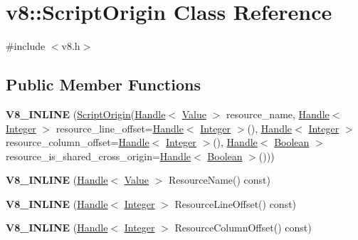 \hypertarget{classv8_1_1_script_origin}{}\section{v8\+:\+:Script\+Origin Class Reference}
\label{classv8_1_1_script_origin}


{\ttfamily \#include $<$v8.\+h$>$}

\subsection*{Public Member Functions}
\begin{DoxyCompactItemize}
\item 
\hypertarget{classv8_1_1_script_origin_a83d29998808aba54a562cdba15520d62}{}{\bfseries V8\+\_\+\+I\+N\+L\+I\+N\+E} (\hyperlink{classv8_1_1_script_origin}{Script\+Origin}(\hyperlink{classv8_1_1_handle}{Handle}$<$ \hyperlink{classv8_1_1_value}{Value} $>$ resource\+\_\+name, \hyperlink{classv8_1_1_handle}{Handle}$<$ \hyperlink{classv8_1_1_integer}{Integer} $>$ resource\+\_\+line\+\_\+offset=\hyperlink{classv8_1_1_handle}{Handle}$<$ \hyperlink{classv8_1_1_integer}{Integer} $>$(), \hyperlink{classv8_1_1_handle}{Handle}$<$ \hyperlink{classv8_1_1_integer}{Integer} $>$ resource\+\_\+column\+\_\+offset=\hyperlink{classv8_1_1_handle}{Handle}$<$ \hyperlink{classv8_1_1_integer}{Integer} $>$(), \hyperlink{classv8_1_1_handle}{Handle}$<$ \hyperlink{classv8_1_1_boolean}{Boolean} $>$ resource\+\_\+is\+\_\+shared\+\_\+cross\+\_\+origin=\hyperlink{classv8_1_1_handle}{Handle}$<$ \hyperlink{classv8_1_1_boolean}{Boolean} $>$()))\label{classv8_1_1_script_origin_a83d29998808aba54a562cdba15520d62}

\item 
\hypertarget{classv8_1_1_script_origin_a3b1475462546cdc12e19125367d6918c}{}{\bfseries V8\+\_\+\+I\+N\+L\+I\+N\+E} (\hyperlink{classv8_1_1_handle}{Handle}$<$ \hyperlink{classv8_1_1_value}{Value} $>$ Resource\+Name() const)\label{classv8_1_1_script_origin_a3b1475462546cdc12e19125367d6918c}

\item 
\hypertarget{classv8_1_1_script_origin_a90e3924ade98ad9a55fde84bfa38bda0}{}{\bfseries V8\+\_\+\+I\+N\+L\+I\+N\+E} (\hyperlink{classv8_1_1_handle}{Handle}$<$ \hyperlink{classv8_1_1_integer}{Integer} $>$ Resource\+Line\+Offset() const)\label{classv8_1_1_script_origin_a90e3924ade98ad9a55fde84bfa38bda0}

\item 
\hypertarget{classv8_1_1_script_origin_a33954a98de843936b2a540ef48960486}{}{\bfseries V8\+\_\+\+I\+N\+L\+I\+N\+E} (\hyperlink{classv8_1_1_handle}{Handle}$<$ \hyperlink{classv8_1_1_integer}{Integer} $>$ Resource\+Column\+Offset() const)\label{classv8_1_1_script_origin_a33954a98de843936b2a540ef48960486}


\end{DoxyCompactItemize}
